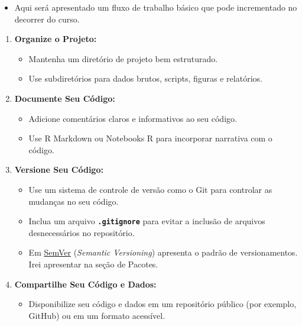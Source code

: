 \documentclass[
  letterpaper,
  DIV=11,
  numbers=noendperiod]{scrartcl}
\providecommand{\tightlist}{%
  \setlength{\itemsep}{0pt}\setlength{\parskip}{0pt}}\usepackage{longtable,booktabs,array}
\begin{document}
\begin{itemize}
\tightlist
\item
  Aqui será apresentado um fluxo de trabalho básico que pode
  incrementado no decorrer do curso.
\end{itemize}

\begin{enumerate}
\def\labelenumi{\arabic{enumi}.}
\item
  \textbf{Organize o Projeto:}

  \begin{itemize}
  \item
    Mantenha um diretório de projeto bem estruturado.
  \item
    Use subdiretórios para dados brutos, scripts, figuras e relatórios.
  \end{itemize}
\item
  \textbf{Documente Seu Código:}

  \begin{itemize}
  \item
    Adicione comentários claros e informativos ao seu código.
  \item
    Use R Markdown ou Notebooks R para incorporar narrativa com o
    código.
  \end{itemize}
\item
  \textbf{Versione Seu Código:}

  \begin{itemize}
  \item
    Use um sistema de controle de versão como o Git para controlar as
    mudanças no seu código.
  \item
    Inclua um arquivo \textbf{\texttt{.gitignore}} para evitar a
    inclusão de arquivos desnecessários no repositório.
  \item
    Em \href{https://semver.org/lang/pt-BR/}{SemVer} (\emph{Semantic
    Versioning}) apresenta o padrão de versionamentos. Irei apresentar
    na seção de Pacotes.
  \end{itemize}
\item
  \textbf{Compartilhe Seu Código e Dados:}

  \begin{itemize}
  \tightlist
  \item
    Disponibilize seu código e dados em um repositório público (por
    exemplo, GitHub) ou em um formato acessível.
  \end{itemize}
\end{enumerate}
\end{document}
